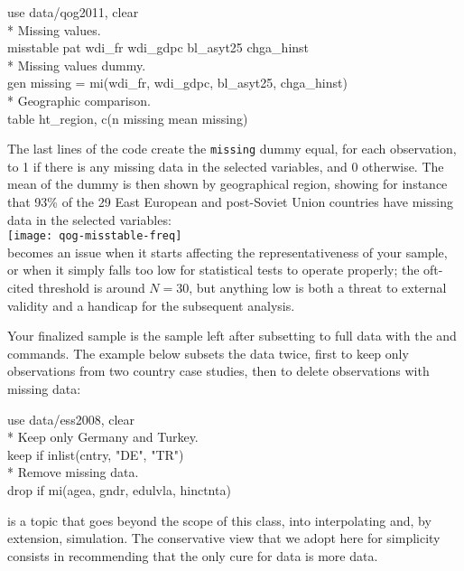 	\begin{docspec}
		use data/qog2011, clear\\%
		* Missing values.\\%
		misstable pat wdi\_fr wdi\_gdpc bl\_asyt25 chga\_hinst\\[1em]%
		* Missing values dummy.\\%
		gen missing = mi(wdi\_fr, wdi\_gdpc, bl\_asyt25, chga\_hinst)\\%
		* Geographic comparison.\\%
		table ht\_region, c(n missing mean missing)
	\end{docspec}
	
	The last lines of the code create the \texttt{missing} dummy equal, for each observation, to 1 if there is any missing data in the selected variables, and 0 otherwise. The mean of the dummy is then shown by geographical region, showing for instance that 93\% of the 29 East European and post-Soviet Union countries have missing data in the selected variables:\\[1em]
	
	\texttt{[image: qog-misstable-freq]}\\[1em]
	
	 becomes an issue when it starts affecting the representativeness of your sample, or when it simply falls too low for statistical tests to operate properly; the oft-cited threshold is around $N = 30$, but anything low is both a threat to external validity and a handicap for the subsequent analysis. 
	
	Your finalized sample is the sample left after subsetting to full data with the  and  commands. The example below subsets the \ESS data twice, first to keep only observations from two country case studies, then to delete observations with missing data:
	
	\begin{docspec}
		use data/ess2008, clear\\
		* Keep only Germany and Turkey.\\
		keep if inlist(cntry, "DE", "TR")\\
		* Remove missing data.\\
		drop if mi(agea, gndr, edulvla, hinctnta)
	\end{docspec}
	
	 is a topic that goes beyond the scope of this class, into interpolating and, by extension, simulation. The conservative view that we adopt here for simplicity consists in recommending that the only cure for data is more data.

